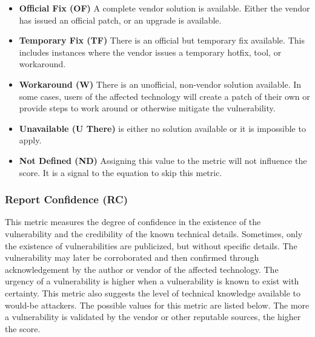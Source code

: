         \begin{itemize}
          \item
            \textbf{Official Fix (OF)} A complete vendor solution is available.
            Either the vendor has issued an official patch, or an upgrade is
            available.
          \item
            \textbf{Temporary Fix (TF)} There is an official but temporary fix
            available. This includes instances where the vendor issues a temporary
            hotfix, tool, or workaround.
          \item
            \textbf{Workaround (W)} There is an unofficial, non-vendor solution
            available. In some cases, users of the affected technology will create
            a patch of their own or provide steps to work around or otherwise
            mitigate the vulnerability.
          \item
            \textbf{Unavailable (U There)} is either no solution available or it is
            impossible to apply.
          \item
            \textbf{Not Defined (ND)} Assigning this value to the metric will not
            influence the score. It is a signal to the equation to skip this
            metric.
        \end{itemize}

      \subsubsection{Report Confidence (RC)}\label{subsec:report-confidence-rc}

        This metric measures the degree of confidence in the existence of the
        vulnerability and the credibility of the known technical details.
        Sometimes, only the existence of vulnerabilities are publicized, but
        without specific details. The vulnerability may later be corroborated
        and then confirmed through acknowledgement by the author or vendor of
        the affected technology. The urgency of a vulnerability is higher when a
        vulnerability is known to exist with certainty. This metric also
        suggests the level of technical knowledge available to would-be
        attackers. The possible values for this metric are listed below.
        The more a vulnerability is validated by the vendor or other reputable
        sources, the higher the score.

